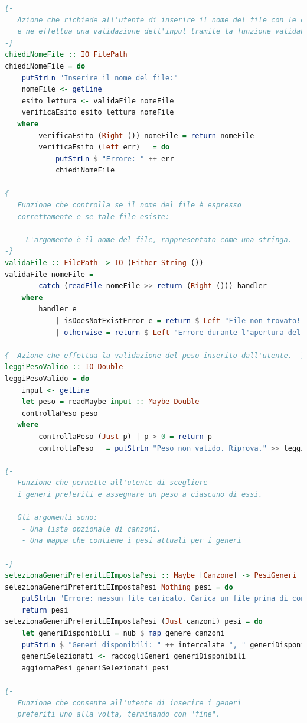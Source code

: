 \documentclass[a4paper,11pt]{article}
\begin{document}
\begin{lstlisting}[language=Haskell]
{-
   Azione che richiede all'utente di inserire il nome del file con le canzoni
   e ne effettua una validazione dell'input tramite la funzione validaFile.
-}
chiediNomeFile :: IO FilePath
chiediNomeFile = do
    putStrLn "Inserire il nome del file:"
    nomeFile <- getLine
    esito_lettura <- validaFile nomeFile
    verificaEsito esito_lettura nomeFile
   where
        verificaEsito (Right ()) nomeFile = return nomeFile
        verificaEsito (Left err) _ = do
            putStrLn $ "Errore: " ++ err
            chiediNomeFile

{-
   Funzione che controlla se il nome del file è espresso
   correttamente e se tale file esiste:

   - L'argomento è il nome del file, rappresentato come una stringa.
-}
validaFile :: FilePath -> IO (Either String ())
validaFile nomeFile =
        catch (readFile nomeFile >> return (Right ())) handler
    where
        handler e
            | isDoesNotExistError e = return $ Left "File non trovato!"
            | otherwise = return $ Left "Errore durante l'apertura del file."

{- Azione che effettua la validazione del peso inserito dall'utente. -}
leggiPesoValido :: IO Double
leggiPesoValido = do
    input <- getLine
    let peso = readMaybe input :: Maybe Double
    controllaPeso peso
   where
        controllaPeso (Just p) | p > 0 = return p
        controllaPeso _ = putStrLn "Peso non valido. Riprova." >> leggiPesoValido

{-
   Funzione che permette all'utente di scegliere
   i generi preferiti e assegnare un peso a ciascuno di essi.

   Gli argomenti sono:
    - Una lista opzionale di canzoni.
    - Una mappa che contiene i pesi attuali per i generi

-}
selezionaGeneriPreferitiEImpostaPesi :: Maybe [Canzone] -> PesiGeneri -> IO PesiGeneri
selezionaGeneriPreferitiEImpostaPesi Nothing pesi = do
    putStrLn "Errore: nessun file caricato. Carica un file prima di continuare."
    return pesi
selezionaGeneriPreferitiEImpostaPesi (Just canzoni) pesi = do
    let generiDisponibili = nub $ map genere canzoni
    putStrLn $ "Generi disponibili: " ++ intercalate ", " generiDisponibili
    generiSelezionati <- raccogliGeneri generiDisponibili
    aggiornaPesi generiSelezionati pesi

{-
   Funzione che consente all'utente di inserire i generi
   preferiti uno alla volta, terminando con "fine".


\end{lstlisting}
\end{document}
